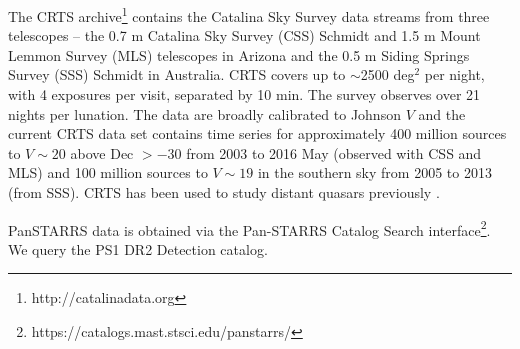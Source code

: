 \documentclass[fleqn,usenatbib]{mnras}
\begin{document}
The CRTS archive\footnote{http://catalinadata.org} contains the
Catalina Sky Survey data streams from three telescopes -- the 0.7 m
Catalina Sky Survey (CSS) Schmidt and 1.5 m Mount Lemmon Survey (MLS)
telescopes in Arizona and the 0.5 m Siding Springs Survey (SSS)
Schmidt in Australia. 
CRTS covers up to $\sim$2500 deg$^2$ per night, with 4 exposures per visit, separated
by 10 min. The survey observes over 21 nights per lunation. The data
are broadly calibrated to Johnson $V$ \citep[see ][for details]{Drake2013}
and the current CRTS data set contains time series for
approximately 400 million sources to $V \sim 20$ above Dec $> -30$
from 2003 to 2016 May (observed with CSS and MLS) and 100 million
sources to $V \sim 19$ in the southern sky from 2005 to 2013 (from
SSS). CRTS has been used to study distant quasars previously
\citep{Graham2014, Graham2015, Graham2015Nature, Graham2017, Graham2019b}.

PanSTARRS data is obtained via the Pan-STARRS Catalog Search
interface\footnote{https://catalogs.mast.stsci.edu/panstarrs/}.
We query the PS1 DR2 Detection catalog.
\end{document}
